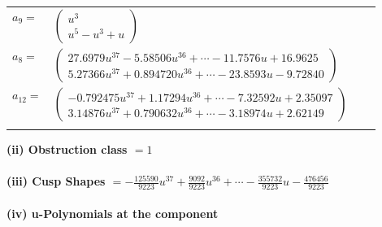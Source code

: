 \documentclass[1p]{elsarticle_modified}
\theoremstyle{definition}
\begin{document}
\begin{tabular}{m{7pt} m{180pt} m{7pt} m{180pt} }
\flushright $a_{9}=$&$\begin{pmatrix}u^3\\u^5- u^3+u\end{pmatrix}$ \\
\flushright $a_{8}=$&$\begin{pmatrix}27.6979 u^{37}-5.58506 u^{36}+\cdots-11.7576 u+16.9625\\5.27366 u^{37}+0.894720 u^{36}+\cdots-23.8593 u-9.72840\end{pmatrix}$ \\
\flushright $a_{12}=$&$\begin{pmatrix}-0.792475 u^{37}+1.17294 u^{36}+\cdots-7.32592 u+2.35097\\3.14876 u^{37}+0.790632 u^{36}+\cdots-3.18974 u+2.62149\end{pmatrix}$\\&\end{tabular}
\flushleft \textbf{(ii) Obstruction class $= 1$}\\~\\
\flushleft \textbf{(iii) Cusp Shapes $= -\frac{125590}{9223} u^{37}+\frac{9092}{9223} u^{36}+\cdots-\frac{355732}{9223} u-\frac{476456}{9223}$}\\~\\
\newpage\renewcommand{\arraystretch}{1}
\flushleft \textbf{(iv) u-Polynomials at the component}\newline \\
\end{document}
